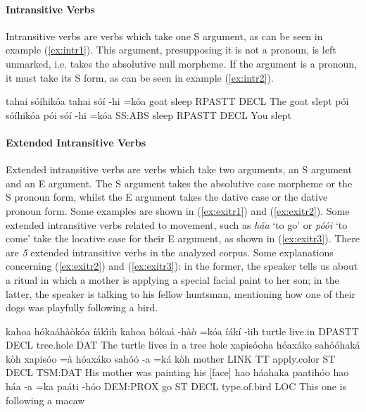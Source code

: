 \documentclass[a4paper, 12pt, oneside]{memoir}
\newcommand{\emh}[1]{\textit{#1}}
\begin{document}
\paragraph{Intransitive Verbs}
Intransitive verbs are verbs which take one S argument, as can be seen in example (\ref{ex:intr1}). This argument, presupposing it is not a pronoun, is left unmarked, i.e. takes the absolutive null morpheme. If the argument is a pronoun, it must take its S form, as can be seen in example (\ref{ex:intr2}).
\begin{examples}
    \ex \label{ex:intr1}
    \words tahai sóíhikóa
    \bits tahai sóí -hi =kóa
    \gloss goat sleep RPASTT DECL
    \tr The goat slept
    \ex \label{ex:intr2}
    \words pói sóíhikóa
    \bits pói sóí -hi =kóa
    \gloss SS:ABS sleep RPASTT DECL 
    \tr You slept
\end{examples}
\paragraph{Extended Intransitive Verbs}
Extended intransitive verbs are verbs which take two arguments, an S argument and an E argument. The S argument takes the absolutive case morpheme or the S pronoun form, whilst the E argument takes the dative case or the dative pronoun form. Some examples are shown in (\ref{ex:exitr1}) and (\ref{ex:exitr2}). Some extended intransitive verbs related to movement, such as \emh{háa} `to go' or \emh{póói} `to come' take the locative case for their E argument, as shown in (\ref{ex:exitr3}). There are \textit{5} extended intransitive verbs in the analyzed corpus. Some explanations concerning (\ref{ex:exitr2}) and (\ref{ex:exitr3}): in the former, the speaker tells us about a ritual in which a mother is applying a special facial paint to her son; in the latter, the speaker is talking to his fellow huntsman, mentioning how one of their dogs was playfully following a bird.
\begin{examples}
    \ex \label{ex:exitr1} 
    \words kahoa hókaáhàòkóa íákìih
    \bits kahoa hókaá -hàò =kóa íákí -ìih 
    \gloss turtle live.in DPASTT DECL tree.hole DAT
    \tr The turtle lives in a tree hole
    \ex \label{ex:exitr2}
    \words xapisóoha hóaxáko sahóóhaká kòh
    \bits xapisóo =à hóaxáko sahóó -a =ká kòh
    \gloss mother LINK TT apply.color ST DECL TSM:DAT
    \tr His mother was painting his [face]
    \ex \label{ex:exitr3}
    \words hao háahaka paatihóo
    \bits  hao háa -a =ka paáti -hóo 
    \gloss DEM:PROX go ST DECL type.of.bird LOC
    \tr This one is following a macaw
\end{examples}
\end{document}
